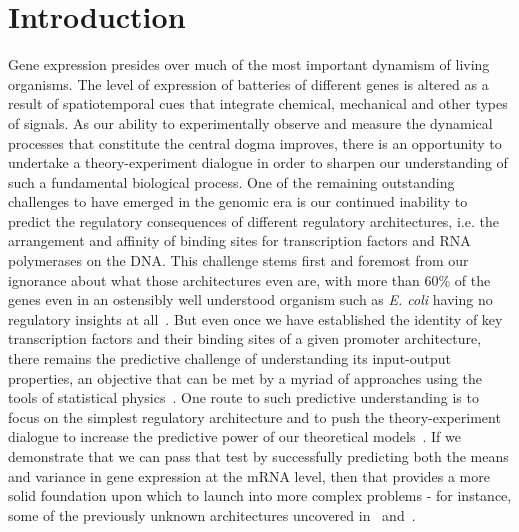 \section{Introduction}

Gene expression presides over much of the most important dynamism of living
organisms. The level of expression of batteries of different genes is altered as
a result of spatiotemporal cues that integrate chemical, mechanical and other
types of signals. As our ability to experimentally observe and measure the
dynamical processes that constitute the central dogma improves, there is an
opportunity to undertake a theory-experiment dialogue in order to sharpen our
understanding of such a fundamental biological process. One of the remaining
outstanding challenges to have emerged in the genomic era is our continued
inability to predict the regulatory consequences of different regulatory
architectures, i.e. the arrangement and affinity of binding sites for
transcription factors and RNA polymerases on the DNA. This challenge stems first
and foremost from our ignorance about what those architectures even are, with
more than 60\% of the genes even in an ostensibly well understood organism such
as {\it E. coli} having no regulatory insights at all~\cite{Rydenfelt2014-2,
Belliveau2018, Ghatak2019, Santos_Zavaleta2019}. But even once we have
established the identity of key transcription factors and their binding sites of
a given promoter architecture, there remains the predictive challenge of
understanding its input-output properties, an objective that can be met by a
myriad of approaches using the tools of statistical physics~\cite{Ackers1982,
Shea1985, Buchler2003, Vilar2003a, Vilar2003b, Bintu2005a, Bintu2005c,
Gertz2009, Sherman2012, Saiz2013, Ko1991, Peccoud1995, Record1996, Kepler2001,
Sanchez2008, Shahrezaei2008, Sanchez2011, Michel2010, Iyer-Biswas2009}. One
route to such predictive understanding is to focus on the simplest regulatory
architecture and to push the theory-experiment dialogue to increase the
predictive power of our theoretical models~\cite{Garcia2011, Phillips2019}. If
we demonstrate that we can pass that test by successfully predicting both the
means and variance in gene expression at the mRNA level, then that provides a
more solid foundation upon which to launch into more complex problems - for
instance, some of the previously unknown architectures uncovered
in~\cite{Belliveau2018} and~\cite{Ireland2020}.

